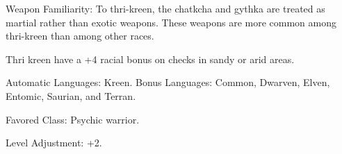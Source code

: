 \begin{itemize*}
    \item Weapon Familiarity: To thri-kreen, the chatkcha and gythka are treated as martial rather than exotic weapons. These weapons are more common among thri-kreen than among other races.
    \item Thri kreen have a +4 racial bonus on  checks in sandy or arid areas.
    \item Automatic Languages: Kreen. Bonus Languages: Common, Dwarven, Elven, Entomic, Saurian, and Terran.
    \item Favored Class: Psychic warrior.
    \item Level Adjustment: +2.
\end{itemize*}
